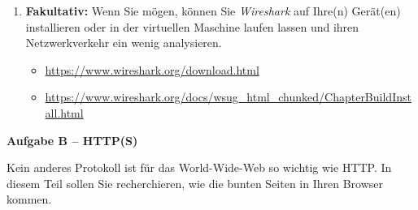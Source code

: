 \documentclass[paper=a4,fontsize=11pt]{scrartcl}%
\numberwithin{equation}{section}
\begin{document}
\begin{enumerate}
\begin{enumerate}
	\end{enumerate}
	\item \textbf{Fakultativ:} Wenn Sie mögen, können Sie \emph{Wireshark} auf Ihre(n) Gerät(en) installieren oder in der virtuellen Maschine laufen lassen und ihren Netzwerkverkehr ein wenig analysieren. 
	\begin{itemize}
		\item \url{https://www.wireshark.org/download.html}
		\item \url{https://www.wireshark.org/docs/wsug_html_chunked/ChapterBuildInstall.html}
	\end{itemize}
\end{enumerate}

\begin{center}\Large{\textbf{Aufgabe B -- HTTP(S)}}\end{center}\vskip0.25in
Kein anderes Protokoll ist für das World-Wide-Web so wichtig wie HTTP. In diesem Teil sollen Sie recherchieren, wie die bunten Seiten in Ihren Browser kommen.
\end{document}
